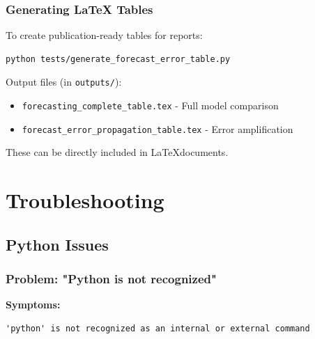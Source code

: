 \documentclass[11pt,a4paper]{article}
\begin{document}
\subsubsection{Generating LaTeX Tables}

To create publication-ready tables for reports:

\begin{commandbox}[title=Generate LaTeX Tables]
\begin{lstlisting}[style=shellstyle]
python tests/generate_forecast_error_table.py
\end{lstlisting}
\end{commandbox}

Output files (in \texttt{outputs/}):
\begin{itemize}[leftmargin=*]
    \item \texttt{forecasting\_complete\_table.tex} - Full model comparison
    \item \texttt{forecast\_error\_propagation\_table.tex} - Error amplification
\end{itemize}

These can be directly included in \LaTeX documents.

\newpage

\section{Troubleshooting}

\subsection{Python Issues}

\subsubsection{Problem: "Python is not recognized"}

\textbf{Symptoms:}
\begin{lstlisting}[style=shellstyle]
'python' is not recognized as an internal or external command
\end{lstlisting}
\end{document}
